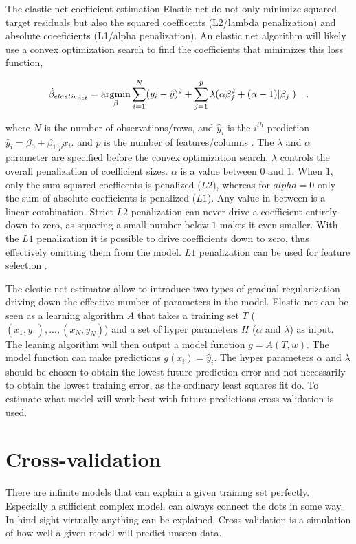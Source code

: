 The elastic net coefficient estimation Elastic-net do not only minimize squared target residuals but also the squared coefficents (L2/lambda penalization) and absolute coeeficients (L1/alpha penalization). An elastic net algorithm will likely use a convex optimization search to find the coefficients that minimizes this loss function,

\begin{equation}
\hat{\beta}_{elastic_{net}}  = 	\underset{\beta}{\operatorname*{\arg\!\min}} 
\sum_{i=1}^{N} (y_i - \hat{y})^2 + 
\sum_{j=1}^{p} \lambda(
	 \alpha       \beta_j^2 + 
    (\alpha -1) | \beta_j |
) \quad ,
\end{equation}

where $N$ is the number of observations/rows, and $\hat{y}_i$ is the $i^{th}$ prediction $\hat{y}_i = \beta_0 + \beta_{1:p} x_i.$ and $p$ is the number of features/columns \cite{friedman2001elements}. The $\lambda$ and $\alpha$ parameter are specified before the convex optimization search. $\lambda$ controls the overall penalization of coefficient sizes. $\alpha$ is a value between 0 and 1. When $1$, only the sum squared coefficents is penalized ($L2$), whereas for $alpha=0$ only the sum of absolute coefficients is penalized ($L1$). Any value in between is a linear combination. Strict $L2$ penalization can never drive a coefficient entirely down to zero, as squaring a small number below $1$ makes it even smaller. With the $L1$ penalization it is possible to drive coefficients down to zero, thus effectively omitting them from the model. $L1$ penalization can be used for feature selection \cite{friedman2001elements}.

The elestic net estimator allow to introduce two types of gradual regularization driving down the effective number of parameters in the model. Elastic net can be seen as a learning algorithm $A$ that takes a training set $T$ ($(x_1,y_1),...,(x_N,y_N)$) and a set of hyper parameters $H$ ($\alpha$ and $\lambda$) as input. The leaning algorithm will then output a model function $g = A(T,w)$. The model function can make predictions $g(x_i)=\hat{y}_i$. The hyper parameters $\alpha$ and $\lambda$ should be chosen to obtain the lowest future prediction error and not necessarily to obtain the lowest training error, as the ordinary least squares fit do. To estimate what model will work best with future predictions cross-validation is used.

\section{Cross-validation}
There are infinite models that can explain a given training set perfectly. Especially a sufficient complex model, can always connect the dots in some way. In hind sight virtually anything can be explained. Cross-validation is a simulation of how well a given model will predict unseen data.

